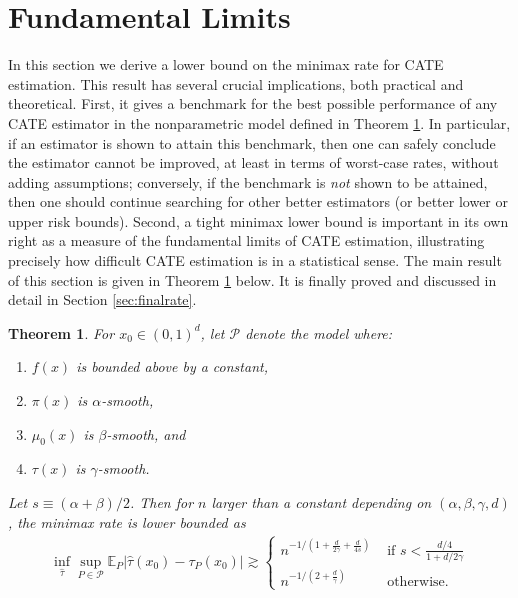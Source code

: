 \documentclass[11pt,twoside]{article}
\newcommand{\E}{\mathbb{E}}
\newtheorem{theorem}{Theorem}
\theoremstyle{definition}
\theoremstyle{remark}
\begin{document}
\section{Fundamental Limits}
\label{sec:lowerbound}


In this section we derive a lower bound on the minimax rate for CATE estimation. This result has several crucial implications, both practical and theoretical. First, it gives a benchmark for the best possible performance of any CATE estimator in the nonparametric model defined in Theorem \ref{thm:lowerbound}. In particular, if an estimator is shown to attain this benchmark, then one can safely conclude the estimator cannot be improved, at least in terms of worst-case rates, without adding assumptions; conversely, if the benchmark is \emph{not} shown to be attained, then one should continue searching for other better estimators (or better lower or upper risk bounds).  Second,  a tight minimax lower bound is important in its own right as a measure of the fundamental limits of CATE estimation, illustrating precisely how difficult CATE estimation is in a statistical sense.  The main result of this section is given in Theorem \ref{thm:lowerbound} below. It is finally proved and discussed in detail in Section \ref{sec:finalrate}. \\

\begin{theorem} \label{thm:lowerbound}
For $x_0 \in (0,1)^d$, let $\mathcal{P}$ denote the model where:
\begin{enumerate}
\item $f(x)$ is bounded above by a constant, 
\item $\pi(x)$ is $\alpha$-smooth, %
\item $\mu_0(x)$ is $\beta$-smooth, and
\item $\tau(x)$ is $\gamma$-smooth.
\end{enumerate}
Let $s \equiv (\alpha+\beta)/2$. 
Then for $n$ larger than a constant depending on $(\alpha,\beta,\gamma,d)$, the minimax rate is lower bounded as
\begin{align*}
\inf_{\widehat\tau} \sup_{P \in \mathcal{P}} \E_P | \widehat\tau(x_0) - \tau_P(x_0)| \gtrsim \begin{cases}
n^{-1/\left(1 + \frac{d}{2\gamma} + \frac{d}{4s} \right) } & \text{ if } s < \frac{d/4}{1+d/2\gamma}  \\
n^{-1/\left(2 + \frac{d}{\gamma}  \right) } & \text{ otherwise}  . 
\end{cases}
\end{align*}
\end{theorem}
\end{document}

